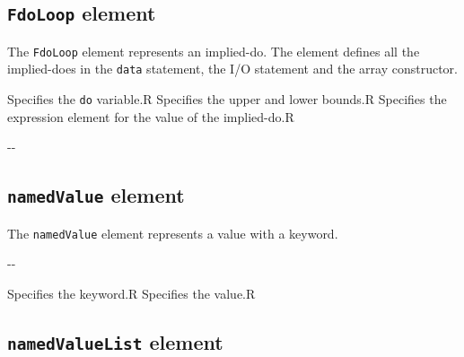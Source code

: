 \subsection{ {\tt FdoLoop} element}

The {\tt FdoLoop} element represents an implied-do.
The element defines all the implied-does in the {\tt data} statement, the I/O statement and the array constructor.


\begin{XcodeMLChildElements}
{Specifies the {\tt do} variable.}{R}
{Specifies the upper and lower bounds.}{R}
{Specifies the expression element for the value of the implied-do.}{R}
\end{XcodeMLChildElements}

\begin{XcodeMLAttributes}
\XcodeMLAttrDef{-}{-}
{-}{-}
\end{XcodeMLAttributes}


\subsection{ {\tt namedValue} element}

The {\tt namedValue} element represents a value with a keyword.


\begin{XcodeMLChildElements}
\XcodeMLElementDef{-}
{-}{-}
\end{XcodeMLChildElements}

\begin{XcodeMLAttributes}
{Specifies the keyword.}{R}
{Specifies the value.}{R}
\end{XcodeMLAttributes}


\subsection{ {\tt namedValueList} element}

